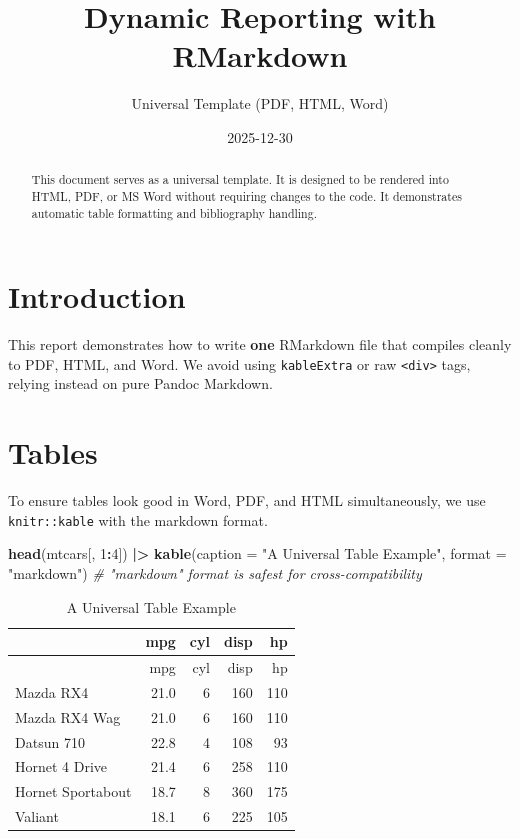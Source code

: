 \documentclass[
]{article}
\title{Dynamic Reporting with RMarkdown}
\subtitle{Universal Template (PDF, HTML, Word)}
\author{}
\date{\vspace{-2.5em}2025-12-30}
\newenvironment{Shaded}{\begin{snugshade}}{\end{snugshade}}
\newcommand{\AttributeTok}[1]{\textcolor[rgb]{0.13,0.29,0.53}{#1}}
\newcommand{\CommentTok}[1]{\textcolor[rgb]{0.56,0.35,0.01}{\textit{#1}}}
\newcommand{\DecValTok}[1]{\textcolor[rgb]{0.00,0.00,0.81}{#1}}
\newcommand{\FunctionTok}[1]{\textcolor[rgb]{0.13,0.29,0.53}{\textbf{#1}}}
\newcommand{\NormalTok}[1]{#1}
\newcommand{\SpecialCharTok}[1]{\textcolor[rgb]{0.81,0.36,0.00}{\textbf{#1}}}
\newcommand{\StringTok}[1]{\textcolor[rgb]{0.31,0.60,0.02}{#1}}
\begin{document}
\maketitle
\begin{abstract}
This document serves as a universal template. It is designed to be
rendered into HTML, PDF, or MS Word without requiring changes to the
code. It demonstrates automatic table formatting and bibliography
handling.
\end{abstract}

{
\setcounter{tocdepth}{2}
\tableofcontents
}
\newpage

\section{Introduction}\label{introduction}

This report demonstrates how to write \textbf{one} RMarkdown file that
compiles cleanly to PDF, HTML, and Word. We avoid using
\texttt{kableExtra} or raw \texttt{\textless{}div\textgreater{}} tags,
relying instead on pure Pandoc Markdown.

\section{Tables}\label{tables}

To ensure tables look good in Word, PDF, and HTML simultaneously, we use
\texttt{knitr::kable} with the markdown format.

\begin{Shaded}
\begin{Highlighting}[]
\FunctionTok{head}\NormalTok{(mtcars[, }\DecValTok{1}\SpecialCharTok{:}\DecValTok{4}\NormalTok{]) }\SpecialCharTok{|\textgreater{}} 
  \FunctionTok{kable}\NormalTok{(}\AttributeTok{caption =} \StringTok{"A Universal Table Example"}\NormalTok{, }
        \AttributeTok{format =} \StringTok{"markdown"}\NormalTok{)  }\CommentTok{\# "markdown" format is safest for cross{-}compatibility}
\end{Highlighting}
\end{Shaded}

\begin{longtable}[]{@{}lrrrr@{}}
\caption{A Universal Table Example}\tabularnewline
\toprule\noalign{}
& mpg & cyl & disp & hp \\
\midrule\noalign{}
\endfirsthead
\toprule\noalign{}
& mpg & cyl & disp & hp \\
\midrule\noalign{}
\endhead
\bottomrule\noalign{}
\endlastfoot
Mazda RX4 & 21.0 & 6 & 160 & 110 \\
Mazda RX4 Wag & 21.0 & 6 & 160 & 110 \\
Datsun 710 & 22.8 & 4 & 108 & 93 \\
Hornet 4 Drive & 21.4 & 6 & 258 & 110 \\
Hornet Sportabout & 18.7 & 8 & 360 & 175 \\
Valiant & 18.1 & 6 & 225 & 105 \\
\end{longtable}
\end{document}
